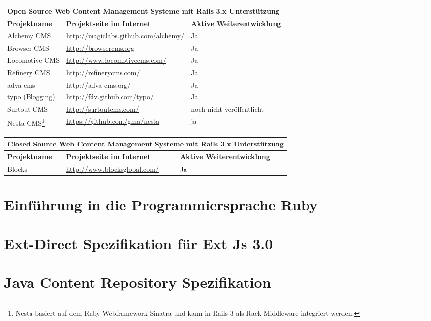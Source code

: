 
\begin{table}
\center
\begin{tabular}[]{|p{3cm}|p{8cm}|p{4cm}|}
\hline
\multicolumn{3}{|p{15cm}|}{\textbf{Open Source Web Content Management Systeme mit Rails 3.x Unterstützung}}\\
\hline
\textbf{Projektname}&\textbf{Projektseite im Internet}&\textbf{Aktive Weiterentwicklung}\\
\hline
Alchemy CMS & \href{http://magiclabs.github.com/alchemy/}{http://magiclabs.github.com/alchemy/} & Ja \\
\hline
Browser CMS & \href{http://browsercms.org}{http://browsercms.org} & Ja \\
\hline
Locomotive CMS & \href{http://www.locomotivecms.com/}{http://www.locomotivecms.com/} & Ja \\
\hline
Refinery CMS & \href{http://refinerycms.com/}{http://refinerycms.com/} & Ja \\
\hline
adva-cms & \href{http://adva-cms.org/}{http://adva-cms.org/} & Ja \\
\hline
typo (Blogging) & \href{http://fdv.github.com/typo/}{http://fdv.github.com/typo/} & Ja \\
\hline
Surtout CMS & \href{http://surtoutcms.com/}{http://surtoutcms.com/} & noch nicht veröffentlicht \\
\hline
Nesta CMS\footnote{Nesta basiert auf dem Ruby Webframework Sinatra und kann in Rails 3 als Rack-Middleware integriert werden.} & \href{https://github.com/gma/nesta}{https://github.com/gma/nesta} & ja  \\
\hline
\end{tabular}
\end{table}

\begin{table}
\center
\begin{tabular}[]{|p{3cm}|p{8cm}|p{4cm}|}
\hline
\multicolumn{3}{|p{15cm}|}{\textbf{Closed Source Web Content Management Systeme mit Rails 3.x Unterstützung}}\\
\hline
\textbf{Projektname}&\textbf{Projektseite im Internet}&\textbf{Aktive Weiterentwicklung}\\
\hline
Blocks & \href{http://www.blocksglobal.com/}{http://www.blocksglobal.com/} & Ja \\
\hline
\end{tabular}
\end{table}


\newpage

\section{Einführung in die Programmiersprache Ruby}



\section{Ext-Direct Spezifikation für Ext Js 3.0}



\section{Java Content Repository Spezifikation}
%

